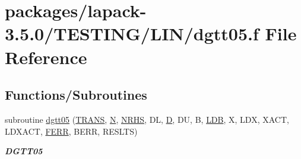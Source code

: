 \hypertarget{dgtt05_8f}{}\section{packages/lapack-\/3.5.0/\+T\+E\+S\+T\+I\+N\+G/\+L\+I\+N/dgtt05.f File Reference}
\label{dgtt05_8f}
\subsection*{Functions/\+Subroutines}
\begin{DoxyCompactItemize}
\item 
subroutine \hyperlink{group__double__lin_gac2b2f67cf0d1759269f889fea72658ac}{dgtt05} (\hyperlink{superlu__enum__consts_8h_a0c4e17b2d5cea33f9991ccc6a6678d62a1f61e3015bfe0f0c2c3fda4c5a0cdf58}{T\+R\+A\+N\+S}, \hyperlink{polmisc_8c_a0240ac851181b84ac374872dc5434ee4}{N}, \hyperlink{example__user_8c_aa0138da002ce2a90360df2f521eb3198}{N\+R\+H\+S}, D\+L, \hyperlink{odrpack_8h_a7dae6ea403d00f3687f24a874e67d139}{D}, D\+U, B, \hyperlink{example__user_8c_a50e90a7104df172b5a89a06c47fcca04}{L\+D\+B}, X, L\+D\+X, X\+A\+C\+T, L\+D\+X\+A\+C\+T, \hyperlink{superlu__enum__consts_8h_af00a42ecad444bbda75cde1b64bd7e72a78fd14d7abebae04095cfbe02928f153}{F\+E\+R\+R}, B\+E\+R\+R, R\+E\+S\+L\+T\+S)
\begin{DoxyCompactList}\small\item\em {\bfseries D\+G\+T\+T05} \end{DoxyCompactList}\end{DoxyCompactItemize}
